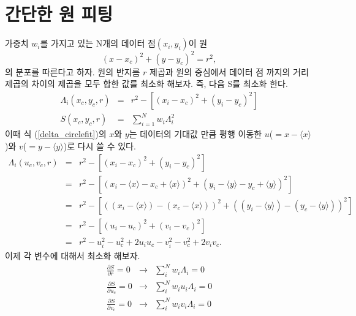 \documentclass[chapter,a4paper,10pt]{oblivoir}
\begin{document}
\section{간단한 원 피팅}
가중치 $w_i$를 가지고 있는 N개의 데이터 점$(x_i, y_i)$이 원
\begin{equation}
(x-x_c)^2 + (y-y_c)^2 = r^2,
\end{equation}
의 분포를 따른다고 하자. 
원의 반지름 $r$ 제곱과 원의 중심에서 데이터 점 까지의 거리 제곱의 차이의 
제곱을 모두 합한 값를 최소화 해보자. 즉, 다음 S를 최소화 한다.
\begin{eqnarray}
\Lambda_i(x_c,y_c,r) &=& r^2 - \left[(x_i-x_c)^2 + (y_i-y_c)^2\right] \label{delta_circlefit} \\
S(x_c,y_c,r) &=& \sum_{i=1}^Nw_i \Lambda_i^2
\end{eqnarray}
이때 식 (\ref{delta_circlefit})의 $x$와 $y$는 데이터의 기대값 만큼 평행 이동한 
$u$($=x-\langle x \rangle$)와 $v$($=y-\langle y \rangle$)로 다시 쓸 수 있다.
\begin{eqnarray}
\Lambda_i(u_c,v_c,r)
&=& r^2 - \left[(x_i-x_c)^2 + (y_i-y_c)^2\right] \\
&=& r^2 - \left[ (x_i - \langle x \rangle - x_c + \langle x \rangle)^2 
 +(y_i - \langle y \rangle - y_c + \langle y \rangle)^2\right] \nonumber\\
&=& r^2 - \left[ ((x_i - \langle x \rangle) - (x_c - \langle x \rangle))^2 
 +((y_i - \langle y \rangle) - (y_c - \langle y \rangle))^2\right] \nonumber\\
&=& r^2 - \left[ (u_i - u_c)^2 +(v_i - v_c)^2\right] \\
&=& r^2 - u_i^2 - u_c^2 + 2u_iu_c - v_i^2 - v_c^2 + 2v_iv_c.\nonumber
\end{eqnarray}
이제 각 변수에 대해서 최소화 해보자.
\begin{eqnarray}
\frac{\partial S}{\partial r} = 0 &\longrightarrow&
\sum_i^Nw_i\Lambda_i = 0 \label{partial_lambda_r}\\
\frac{\partial S}{\partial u_c} = 0 &\longrightarrow& \sum_i^Nw_iu_i\Lambda_i = 0 \label{partial_lambda_u}\\
\frac{\partial S}{\partial v_c} = 0 &\longrightarrow& \sum_i^Nw_iv_i\Lambda_i = 0 \label{partial_lambda_v}
\end{eqnarray}
\end{document}
